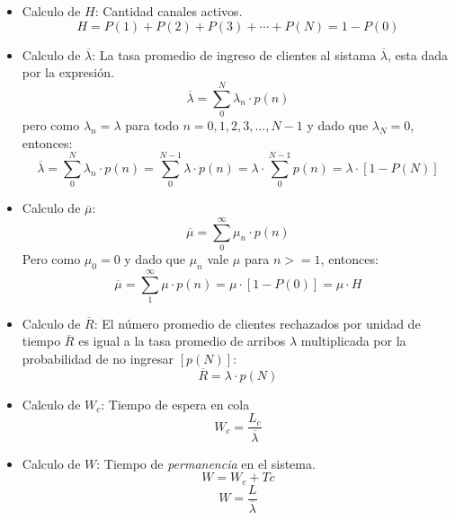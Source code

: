 \documentclass{article}
\begin{document}
\begin{itemize}
    \item Calculo de \(H\): Cantidad canales activos.
        \begin{equation} \label{eu_eqn}
            H = P(1) + P(2) + P(3) + \cdots + P(N) = 1 - P(0)
        \end{equation}
    \item Calculo de \(\overline{\lambda}\): La tasa promedio de ingreso de clientes al sistama \(\overline{\lambda}\), esta dada por la expresión.
        \[
            \overline{\lambda} = \sum_{0}^{N}\lambda_n \cdot p(n) 
        \]
        pero como \(\lambda_n = \lambda\) para todo \(n=0,1,2,3,...,N-1\) y dado que \(\lambda_N=0\), entonces:
        \begin{equation} \label{eu_eqn}
            \overline{\lambda} = \sum_{0}^{N}\lambda_n \cdot p(n) = \sum_{0}^{N-1}\lambda \cdot p(n) = \lambda \cdot \sum_{0}^{N-1}p(n) = \lambda \cdot [1-P(N)]
        \end{equation}  
    \item Calculo de \(\overline{\mu}\): 
        \[
            \overline{\mu} = \sum_{0}^{\infty}\mu_n \cdot p(n) 
        \]
        Pero como \(\mu_0=0\) y dado que \(\mu_n\) vale \(\mu\) para \(n>=1\), entonces:
        \begin{equation} \label{eu_eqn}
            \overline{\mu} = \sum_{1}^{\infty}\mu \cdot p(n) = \mu \cdot [1-P(0)] = \mu \cdot H
        \end{equation}  
    \item Calculo de \(\overline{R}\): El número promedio de clientes rechazados por unidad de tiempo \(\overline{R}\) es igual a la tasa promedio de arribos \(\lambda\) multiplicada por la probabilidad de no ingresar \([p(N)]\):        \begin{equation} \label{eu_eqn}
            \overline{R} = \lambda \cdot p(N)
        \end{equation}  
    \item Calculo de \(W_c\): Tiempo de espera en cola
        \begin{equation}
            W_c = \frac{L_c}{\overline{\lambda}}
        \end{equation}  
    \item Calculo de \(W\): Tiempo de \textit{permanencia} en el sistema.
        \begin{equation} \label{eu_eqn}
            W = W_c+Tc 
        \end{equation}  
        \begin{equation} \label{eu_eqn}
            W = \frac{L}{\overline{\lambda}} 
        \end{equation}
    \end{itemize}
\end{document}
